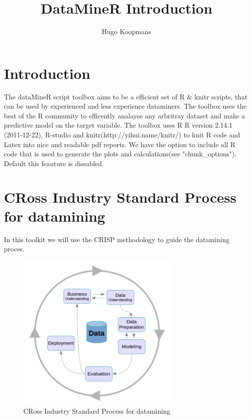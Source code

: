 \documentclass[12pt,a4paper,titlepage]{report}\usepackage{graphicx, color}
\author{Hugo Koopmans}
\title{DataMineR Introduction}
\begin{document}
\maketitle
\tableofcontents
\newpage
\section{Introduction}
The dataMineR script toolbox aims to be a efficient set of R \& knitr scripts, that can be used by experienced and less experience dataminers. The toolbox uses the best of the R community to efficently analayse any arbritray dataset and make a predictive model on the target variable.
The toolbox uses R R version 2.14.1 (2011-12-22), R-studio and knitr(http://yihui.name/knitr/) to knit R code and Latex into nice and readable pdf reports. We have the option to include all R code that is used to generate the plots and calculations(see "chunk\_options"). Default this feauture is dissabled.\\
\section{CRoss Industry Standard Process for datamining}
In this toolkit we will use the CRISP methodology to guide the datamining proces.

\begin{figure}[H]
  \centering
  \includegraphics[width=8cm]{./figure/CRISP-circle.png}
  \caption{CRoss Industry Standard Process for datamining}
\end{figure}
\end{document}

